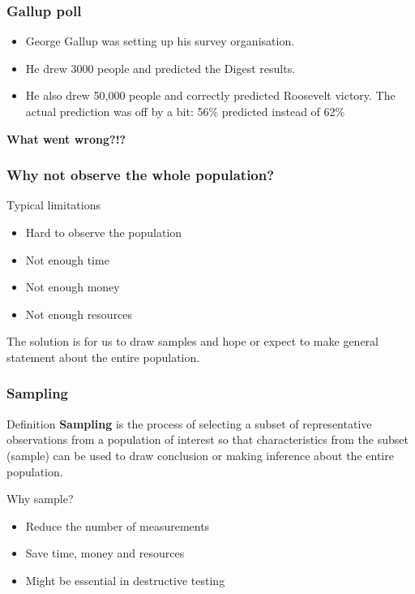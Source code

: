 \documentclass[a4paper]{article}\usepackage[]{graphicx}\usepackage[]{xcolor}
\begin{document}
\subsubsection{Gallup poll}
\begin{itemize}
    \item George Gallup was setting up his survey organisation.
    \item He drew 3000 people and predicted the Digest results.
    \item He also drew 50,000 people and correctly predicted Roosevelt victory. The actual prediction was off by a bit: 56\% predicted instead of 62\%
\end{itemize}
\begin{greenbox}
	\textbf{What went wrong?!?}
\end{greenbox}
\subsubsection{Why not observe the whole population?}
\begin{bluebox}{Typical limitations}
\begin{itemize}
    \item Hard to observe the population
    \item Not enough time
    \item Not enough money
    \item Not enough resources
\end{itemize}
\end{bluebox}
The solution is for us to draw samples and hope or expect to make general statement about the entire population.
\subsubsection{Sampling}
\begin{bluebox}{Definition}
    \textbf{Sampling} is the process of selecting a subset of representative observations from a population of interest so that characteristics from the subset (sample) can be used to draw conclusion or making inference about the entire population.
\end{bluebox}
Why sample?
\begin{itemize}
    \item Reduce the number of measurements
    \item Save time, money and resources
    \item Might be essential in destructive testing
\end{itemize}
\end{document}
